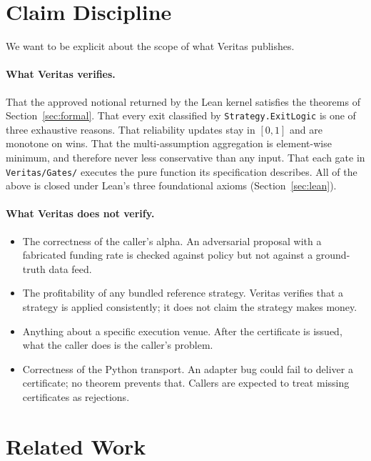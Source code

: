 \documentclass[11pt, a4paper]{article}
\begin{document}
\section{Claim Discipline}
\label{sec:claims}

We want to be explicit about the scope of what Veritas publishes.

\paragraph{What Veritas verifies.} That the approved notional returned by
the Lean kernel satisfies the theorems of Section~\ref{sec:formal}. That
every exit classified by \texttt{Strategy.ExitLogic} is one of three
exhaustive reasons. That reliability updates stay in $[0,1]$ and are
monotone on wins. That the multi-assumption aggregation is
element-wise minimum, and therefore never less conservative than any
input. That each gate in \texttt{Veritas/Gates/} executes the pure
function its specification describes. All of the above is closed under
Lean's three foundational axioms (Section~\ref{sec:lean}).

\paragraph{What Veritas does not verify.}
\begin{itemize}[leftmargin=1.5em, itemsep=1pt, topsep=2pt]
\item The correctness of the caller's alpha. An adversarial proposal
      with a fabricated funding rate is checked against policy but not
      against a ground-truth data feed.
\item The profitability of any bundled reference strategy. Veritas
      verifies that a strategy is applied consistently; it does not
      claim the strategy makes money.
\item Anything about a specific execution venue. After the certificate
      is issued, what the caller does is the caller's problem.
\item Correctness of the Python transport. An adapter bug could fail
      to deliver a certificate; no theorem prevents that. Callers are
      expected to treat missing certificates as rejections.
\end{itemize}

\section{Related Work}
\label{sec:related}
\end{document}
